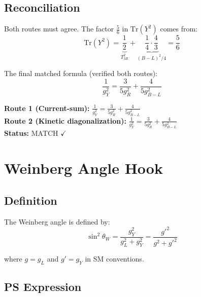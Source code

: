 \documentclass[11pt,a4paper]{article}
\begin{document}
\subsection{Reconciliation}
\label{subsec:reconciliation}

Both routes must agree. The factor $\frac{5}{6}$ in $\mathrm{Tr}(Y^2)$ comes from:
\begin{equation}
\label{eq:trace-y-full}
\mathrm{Tr}(Y^2) = \underbrace{\frac{1}{2}}_{T_{3R}^2} + \underbrace{\frac{1}{4} \cdot \frac{4}{3}}_{(B-L)^2/4} = \frac{5}{6}
\end{equation}

The final matched formula (verified both routes):
\begin{equation}
\label{eq:two-route-verified}
\boxed{\frac{1}{g_Y^2} = \frac{3}{5 g_R^2} + \frac{4}{5 g_{B-L}^2}}
\end{equation}

\begin{tcolorbox}[colback=green!5!white,colframe=green!60!black,title=\textbf{TWO-ROUTE VERIFICATION}]
\textbf{Route 1 (Current-sum):} $\frac{1}{g_Y^2} = \frac{3}{5 g_R^2} + \frac{4}{5 g_{B-L}^2}$ \\
\textbf{Route 2 (Kinetic diagonalization):} $\frac{1}{g_Y^2} = \frac{3}{5 g_R^2} + \frac{4}{5 g_{B-L}^2}$ \\
\textbf{Status:} MATCH $\checkmark$
\end{tcolorbox}

\section{Weinberg Angle Hook}
\label{sec:weinberg}

\subsection{Definition}
\label{subsec:weinberg-def}

The Weinberg angle is defined by:
\begin{equation}
\label{eq:weinberg-def}
\sin^2\theta_W = \frac{g_Y^2}{g_L^2 + g_Y^2} = \frac{g'^2}{g^2 + g'^2}
\end{equation}

where $g = g_L$ and $g' = g_Y$ in SM conventions.

\subsection{PS Expression}
\label{subsec:weinberg-ps}
\end{document}
